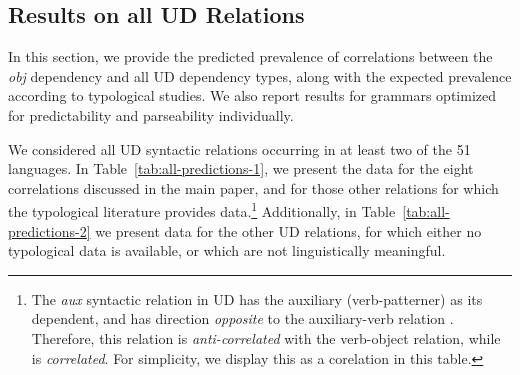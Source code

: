 \documentclass[10pt,twoside,lineno]{article}
\begin{document}
\subsection{Results on all UD Relations}
In this section, we provide the predicted prevalence of correlations between the \emph{obj} dependency and all UD dependency types, along with the expected prevalence according to typological studies.
We also report results for grammars optimized for predictability and parseability individually.


We considered all UD syntactic relations occurring in at least two of the 51 languages.
In Table~\ref{tab:all-predictions-1}, we present the data for the eight correlations discussed in the main paper, and for those other relations for which the typological literature provides data.\footnote{The \emph{aux} syntactic relation in UD has the auxiliary (verb-patterner) as its dependent, and has direction \emph{opposite} to the auxiliary-verb relation . Therefore, this relation is \emph{anti-correlated} with the verb-object relation, while  is \emph{correlated}.  For simplicity, we display this as a corelation in this table.}
Additionally, in Table~\ref{tab:all-predictions-2} we present data for the other UD relations, for which either no typological data is available, or which are not linguistically meaningful.



%
\end{document}
